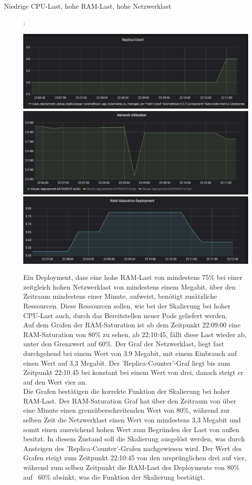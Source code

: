 \documentclass[a4paper,10pt]{scrartcl}
\begin{document}
\begin{description}
\pagebreak

\item[Niedrige CPU-Last, hohe RAM-Last, hohe Netzwerklast]:\\
\begin{minipage}{\linewidth}
            \includegraphics[width=.5\textwidth]{img/RAMSkalierung/Replica-Count.PNG}
            \includegraphics[scale=1,width=.5\textwidth,height=.14\textheight]{img/RAMSkalierung/Netzwerk.PNG}
  			\includegraphics[scale=1,width=.5\textwidth]{img/RAMSkalierung/RAMSaturation.PNG}

\end{minipage}

Ein Deployment, dass eine hohe RAM-Last von mindestens 75\% bei einer zeitgleich hohen Netzwerklast von mindestens einem Megabit, über den Zeitraum mindestens einer Minute, aufweist, benötigt zusätzliche Ressourcen. Diese Ressourcen sollen, wie bei der Skalierung bei hoher CPU-Last auch, durch das Bereitstellen neuer Pods geliefert werden.\\
Auf dem Grafen der RAM-Saturation ist ab dem Zeitpunkt 22:09:00 eine RAM-Saturation von 80\% zu sehen, ab 22:10:45, fällt diese Last wieder ab, unter den Grenzwert auf 60\%. Der Graf der Netzwerklast, liegt fast durchgehend bei einem Wert von 3.9 Megabit, mit einem Einbrauch auf einen Wert auf 3,3 Megabit. Der 'Replica-Counter'-Graf liegt bis zum Zeitpunkt 22:10.45 bei konstant bei einem Wert von drei, danach steigt er auf den Wert vier an.\\
Die Grafen bestätigen die korrekte Funktion der Skalierung bei hoher RAM-Last. 
Der RAM-Saturation Graf hat über den Zeitraum von über eine Minute einen grenzüberschreitenden Wert von 80\%, während zur selben Zeit die Netzwerklast einen Wert von mindestens 3,3 Megabit und somit einen ausreichend hohen Wert zum Begründen der Last von außen besitzt. In diesem Zustand soll die Skalierung ausgelöst werden, was durch Ansteigen des 'Replica-Counter'-Grafen nachgewiesen wird. Der Wert des Grafen steigt zum Zeitpunkt 22:10:45 von den ursprünglichen drei auf vier, während zum selben Zeitpunkt die RAM-Last des Deployments von 80\% auf ~60\% absinkt, was die Funktion der Skalierung bestätigt.



\end{description}
\end{document}
